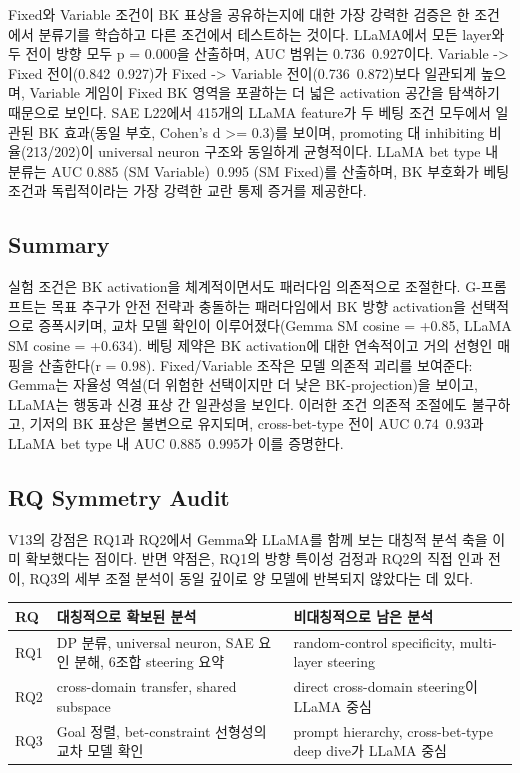 \documentclass[11pt,a4paper]{article}
\begin{document}
Fixed와 Variable 조건이 BK 표상을 공유하는지에 대한 가장 강력한 검증은 한 조건에서 분류기를 학습하고 다른 조건에서 테스트하는 것이다. LLaMA에서 모든 layer와 두 전이 방향 모두 p = 0.000을 산출하며, AUC 범위는 0.736~0.927이다. Variable -> Fixed 전이(0.842~0.927)가 Fixed -> Variable 전이(0.736~0.872)보다 일관되게 높으며, Variable 게임이 Fixed BK 영역을 포괄하는 더 넓은 activation 공간을 탐색하기 때문으로 보인다. SAE L22에서 415개의 LLaMA feature가 두 베팅 조건 모두에서 일관된 BK 효과(동일 부호, Cohen's d >= 0.3)를 보이며, promoting 대 inhibiting 비율(213/202)이 universal neuron 구조와 동일하게 균형적이다. LLaMA bet type 내 분류는 AUC 0.885 (SM Variable)~0.995 (SM Fixed)를 산출하며, BK 부호화가 베팅 조건과 독립적이라는 가장 강력한 교란 통제 증거를 제공한다.

\subsection{Summary}

실험 조건은 BK activation을 체계적이면서도 패러다임 의존적으로 조절한다. G-프롬프트는 목표 추구가 안전 전략과 충돌하는 패러다임에서 BK 방향 activation을 선택적으로 증폭시키며, 교차 모델 확인이 이루어졌다(Gemma SM cosine = +0.85, LLaMA SM cosine = +0.634). 베팅 제약은 BK activation에 대한 연속적이고 거의 선형인 매핑을 산출한다(r = 0.98). Fixed/Variable 조작은 모델 의존적 괴리를 보여준다: Gemma는 자율성 역설(더 위험한 선택이지만 더 낮은 BK-projection)을 보이고, LLaMA는 행동과 신경 표상 간 일관성을 보인다. 이러한 조건 의존적 조절에도 불구하고, 기저의 BK 표상은 불변으로 유지되며, cross-bet-type 전이 AUC 0.74~0.93과 LLaMA bet type 내 AUC 0.885~0.995가 이를 증명한다.

\subsection{RQ Symmetry Audit}

V13의 강점은 RQ1과 RQ2에서 Gemma와 LLaMA를 함께 보는 대칭적 분석 축을 이미 확보했다는 점이다. 반면 약점은, RQ1의 방향 특이성 검정과 RQ2의 직접 인과 전이, RQ3의 세부 조절 분석이 동일 깊이로 양 모델에 반복되지 않았다는 데 있다.

\begin{table}[H]
\centering
\small
\begin{tabular}{|l|l|l|}
\hline
RQ & 대칭적으로 확보된 분석 & 비대칭적으로 남은 분석 \\
\hline
RQ1 & DP 분류, universal neuron, SAE 요인 분해, 6조합 steering 요약 & random-control specificity, multi-layer steering \\
\hline
RQ2 & cross-domain transfer, shared subspace & direct cross-domain steering이 LLaMA 중심 \\
\hline
RQ3 & Goal 정렬, bet-constraint 선형성의 교차 모델 확인 & prompt hierarchy, cross-bet-type deep dive가 LLaMA 중심 \\
\hline
\end{tabular}
\end{table}
\end{document}
